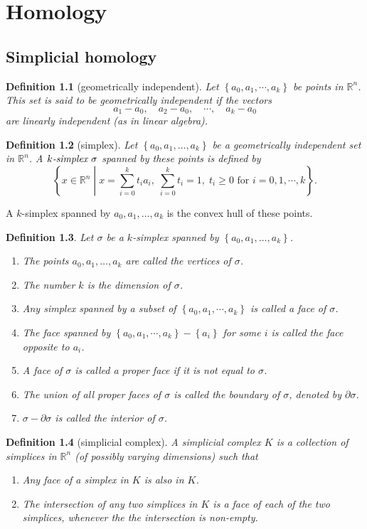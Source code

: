 \documentclass{report}
\newtheorem{definition}{Definition}[section]
\theoremstyle{nonumberplain}
\begin{document}
\chapter{Homology}
\section{Simplicial homology}

\begin{definition}[geometrically independent]
	Let $\left\{a_0, a_1, \cdots, a_k\right\}$ be points in $\mathbb{R}^n$. This set is said to be \emph{geometrically independent} if the vectors
$$
a_1-a_0, \quad a_2-a_0, \quad \cdots, \quad a_k-a_0
$$
are linearly independent (as in linear algebra).
\end{definition}

\begin{definition}[simplex]
Let $\left\{a_0, a_1, \ldots, a_k\right\}$ be a geometrically independent set in $\mathbb{R}^n$. A $\emph{$k$-simplex } \sigma$ spanned by these points is defined by
$$
\left\{x\in \mathbb{R}^n\;\left|\; x=\sum_{i=0}^k t_i a_i,\;\sum_{i=0}^k t_i=1,\;t_i \geq 0\text{ for }i = 0,1,\cdots, k\right.\right\}.
$$
\end{definition}

\noindent A $k$-simplex spanned by $a_0, a_1, \ldots, a_k$ is the convex hull of these points.
\begin{definition}
Let $\sigma$ be a $k$-simplex spanned by $\left\{a_0, a_1, \ldots, a_k\right\}$.
\begin{enumerate}
	\item The points $a_0, a_1, \ldots, a_k$ are called the \emph{vertices} of $\sigma$.
	\item The number $k$ is the \emph{dimension} of $\sigma$.
	\item Any simplex spanned by a subset of $\left\{a_0, a_1, \cdots, a_k\right\}$ is called a \emph{face} of $\sigma$. 
	\item The face spanned by $\left\{a_0, a_1, \cdots, a_k\right\}-\left\{a_i\right\}$ for some $i$ is called the \emph{face opposite} to $a_i$.
	\item A face of $\sigma$ is called a \emph{proper face} if it is not equal to $\sigma$.
	\item The union of all proper faces of $\sigma$ is called the \emph{boundary} of $\sigma$, denoted by $\partial \sigma$.
	\item $\sigma-\partial \sigma$ is called the \emph{interior} of $\sigma$.
\end{enumerate}
\end{definition}
\begin{definition}[simplicial complex]
A \emph{simplicial complex} $K$ is a collection of simplices in $\mathbb{R}^n$ (of possibly varying dimensions) such that
\begin{enumerate}
	\item Any face of a simplex in $K$ is also in $K$.
	\item The intersection of any two simplices in $K$ is a face of each of the two simplices, whenever the the intersection is non-empty.
\end{enumerate}
\end{definition}
\end{document}
